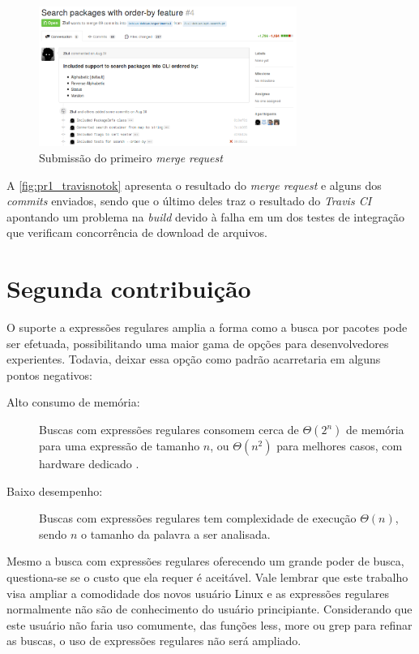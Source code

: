 \begin{figure}[h]
  \centering
	\includegraphics[width=0.75\textwidth]{figuras/pr1}
  \caption{Submissão do primeiro \textit{merge request}}
  \label{fig:pr1_travisnotok}
\end{figure}

A \autoref{fig:pr1_travisnotok} apresenta o resultado do \textit{merge request} e alguns dos \textit{commits} enviados, sendo que o último deles traz o resultado do \textit{Travis CI} apontando um problema na \textit{build} devido à falha em um dos testes de integração que verificam concorrência de download de arquivos.



\section{Segunda contribuição} %
\label{sec:segunda_contribui_o}

O suporte a expressões regulares amplia a forma como a busca por pacotes pode ser efetuada, possibilitando uma maior gama de opções para desenvolvedores experientes. Todavia, deixar essa opção como padrão acarretaria em alguns pontos negativos:

\begin{description}
	\item [Alto consumo de memória:] Buscas com expressões regulares consomem cerca de $\Theta(2^n)$ de memória para uma expressão de tamanho $n$, ou $\Theta(n^2)$ para melhores casos, com hardware dedicado \cite{sidhu2001fast}.
	\item [Baixo desempenho:] Buscas com expressões regulares tem complexidade de execução $\Theta(n)$, sendo $n$ o tamanho da palavra a ser analisada.
\end{description}

Mesmo a busca com expressões regulares oferecendo um grande poder de busca, questiona-se se o custo que ela requer é aceitável. Vale lembrar que este trabalho visa ampliar a comodidade dos novos usuário Linux e as expressões regulares normalmente não são de conhecimento do usuário principiante. Considerando que este usuário não faria uso comumente, das funções {\code less}, {\code more} ou {\code grep} para refinar as buscas,  o uso de expressões regulares não será ampliado.

